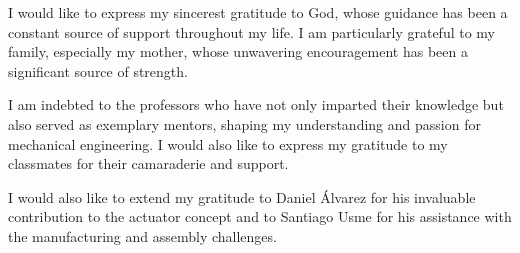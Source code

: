 \par I would like to express my sincerest gratitude to God, whose guidance has been a constant source of support throughout my life. I am particularly grateful to my family, especially my mother, whose unwavering encouragement has been a significant source of strength.
\par I am indebted to the professors who have not only imparted their knowledge but also served as exemplary mentors, shaping my understanding and passion for mechanical engineering. I would also like to express my gratitude to my classmates for their camaraderie and support. \par I would also like to extend my gratitude to Daniel Álvarez for his invaluable contribution to the actuator concept and to Santiago Usme for his assistance with the manufacturing and assembly challenges.